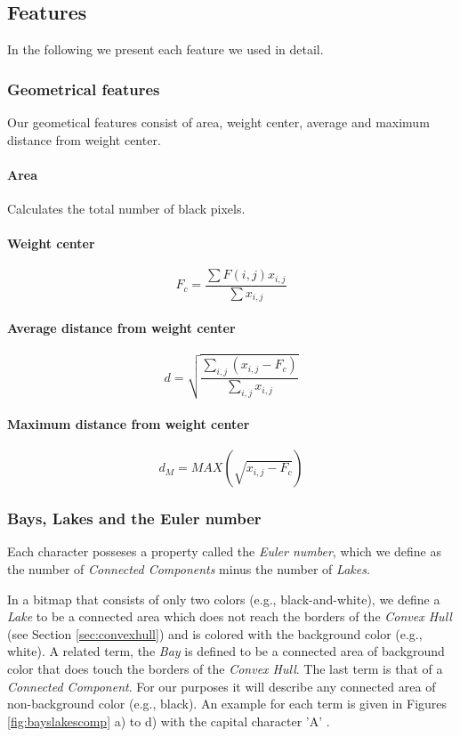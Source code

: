 \documentclass{article}
\begin{document}
\subsection{Features}
\label{sec:features}
In the following we present each feature we used in detail.

\subsubsection{Geometrical features}
\label{sec:geometrical}
Our geometical features consist of area, weight center, average and maximum distance from weight center.
\paragraph{Area}
Calculates the total number of black pixels.

\paragraph{Weight center}
\begin{equation}
F_c=\frac{\sum F(i,j)x_{i,j}}{\sum x_{i,j}}
\end{equation}

\paragraph{Average distance from weight center}
\begin{equation}
d = \sqrt{\frac{\sum_{i,j}(x_{i,j} - F_c)}{\sum_{i,j}x_{i,j}}}
\end{equation}

\paragraph{Maximum distance from weight center}
\begin{equation}
	d_M = MAX(\sqrt{x_{i,j}-F_c})
\end{equation}

\subsubsection{Bays, Lakes and the Euler number}
\label{sec:lakeseuler}
Each character posseses a property called the \textit{Euler number}, which we define as the number of \textit{Connected Components} minus the number of \textit{Lakes}.

In a bitmap that consists of only two colors (e.g., black-and-white), we define a \textit{Lake} to be a connected area which does not reach the borders of the \textit{Convex Hull} (see Section \ref{sec:convexhull}) and is colored with the background color (e.g., white). A related term, the \textit{Bay} is defined to be a connected area of background color that does touch the borders of the \textit{Convex Hull}. The last term is that of a \textit{Connected Component}. For our purposes it will describe any connected area of non-background color (e.g., black). An example for each term is given in Figures \ref{fig:bayslakescomp} a) to d) with the capital character 'A' .
\end{document}
